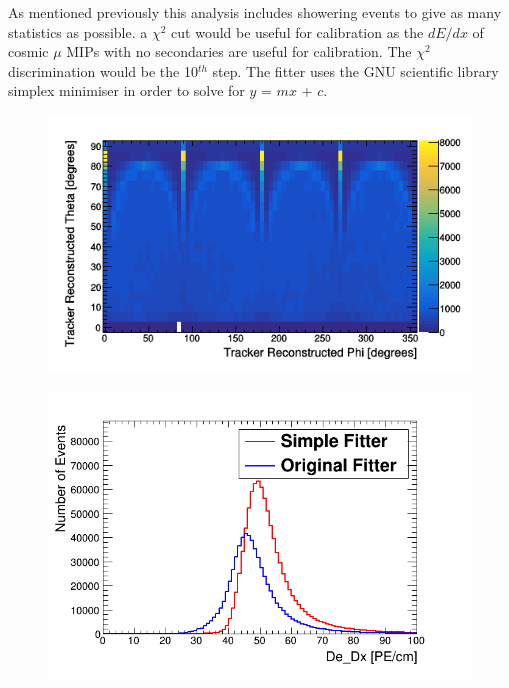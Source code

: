 As mentioned previously this analysis includes showering events to give as many statistics as possible. a $\chi^2$ cut would be useful for calibration as the $dE/dx$ of cosmic $\mu$ MIPs with no secondaries are useful for calibration. The $\chi^2$ discrimination would be the 10$^{th}$ step. The fitter uses the GNU scientific library simplex minimiser \cite{galassi2002gnu} in order to solve for $y$ = $mx$ + $c$.  

\begin{figure}[!h]
 \centering
 \includegraphics[width=0.8\linewidth]{Chapter5/Figs/Raster/pvsTFiduicalHemisphere.png}
 \label{fig:simulatedHemisphereDist}
\end{figure}

\begin{figure}[!h]
 \centering
 \includegraphics[width=0.8\linewidth]{Chapter5/Figs/Raster/dedxComarison.png}
 \label{fig:dedxGenVsRecoHem}
\end{figure}

